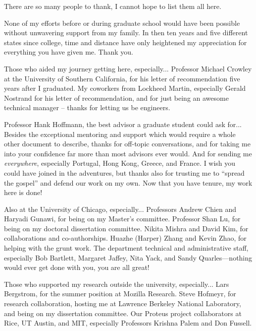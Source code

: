 There are so many people to thank, I cannot hope to list them all here.

None of my efforts before or during graduate school would have been possible without unwavering support from my family.
In then ten years and five different states since college, time and distance have only heightened my appreciation for everything you have given me.
Thank you.

Those who aided my journey getting here, especially...
Professor Michael Crowley at the University of Southern California, for his letter of recommendation five years after I graduated.
My coworkers from Lockheed Martin, especially Gerald Nostrand for his letter of recommendation, and for just being an awesome technical manager -- thanks for letting us be engineers.

Professor Hank Hoffmann, the best advisor a graduate student could ask for...
Besides the exceptional mentoring and support which would require a whole other document to describe, thanks for off-topic conversations, and for taking me into your confidence far more than most advisors ever would.
And for sending me \emph{everywhere}, especially Portugal, Hong Kong, Greece, and France.
I wish you could have joined in the adventures, but thanks also for trusting me to ``spread the gospel'' and defend our work on my own.
Now that you have tenure, my work here is done!

Also at the University of Chicago, especially...
Professors Andrew Chien and Haryadi Gunawi, for being on my Master's committee.
Professor Shan Lu, for being on my doctoral dissertation committee.
Nikita Mishra and David Kim, for collaborations and co-authorships.
Huazhe (Harper) Zhang and Kevin Zhao, for helping with the grunt work.
The department technical and administrative staff, especially Bob Bartlett, Margaret Jaffey, Nita Yack, and Sandy Quarles---nothing would ever get done with you, you are all great!

Those who supported my research outside the university, especially...
Lars Bergstrom, for the summer position at Mozilla Research.
Steve Hofmeyr, for research collaboration, hosting me at Lawrence Berkeley National Laboratory, and being on my dissertation committee.
Our Proteus project collaborators at Rice, UT Austin, and MIT, especially Professors Krishna Palem and Don Fussell.

